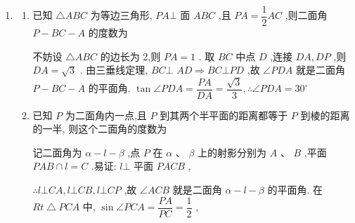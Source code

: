 \begin{enumerate}
\begin{enumerate}
\begin{jieda}
            $\angle {ACB}$ 就是二面角 $\alpha  - l - \beta$ 的平面角, $A$ 到 $\beta$ 的距离 ${AB} = {AC} \cdot  \sin \angle {ACB} = 2\sqrt{3} \cdot  \sin {60}^{ \circ  } = 3$
        \end{jieda}
        \item 两个等腰三角形 ${ABC}$ 与 ${DBC}$ 的公共底边 ${BC} = {16}{{cm}},{AB} = {17}{{cm}},{DB}\bot {DC}$ ,且二面角 $A - {BC} - D$ 成 ${60}^{ \circ  }$ ,则 $A,D$ 间的距离等于 ${{cm}}$
        \begin{jieda}
            取线段 ${BC}$ 中点为 $E$ ,连接 $\bigtriangleup  {AED}$ 三边. 由于 ${EA}$ , ${ED}$ 都与 ${BC}$ 垂直

            $\angle {AED}$ 就是二面角 $A - {BC} - D$ 的平面角, ${EA} = \sqrt{B{A}^{2} - B{E}^{2}} = {15}{{cm}},{ED} = {EB} = 8{{cm}}$ ,由余弦定理, ${AD} =$  $\sqrt{E{A}^{2} + E{D}^{2} - 2 \cdot  {EA} \cdot  {ED} \cdot  \cos \angle {AED}} = {13}{{cm}}.$
        \end{jieda}
    \end{enumerate}
    \item \begin{enumerate}
        \item 已知 $\bigtriangleup {ABC}$ 为等边三角形, ${PA} \bot$ 面 ${ABC}$ ,且 ${PA} = \dfrac{1}{2}{AC}$ ,则二面角 $P - {BC} - A$ 的度数为
        \begin{jieda}
            不妨设 $\bigtriangleup {ABC}$ 的边长为 2,则 ${PA} = 1$ . 取 ${BC}$ 中点 $D$ ,连接 ${DA},{DP}$ ,则 ${DA} = \sqrt{3}$ . 由三垂线定理, ${BC} \bot$  ${AD} \Longrightarrow  {BC} \bot  {PD}$ ,故 $\angle {PDA}$ 就是二面角 $P - {BC} - A$ 的平面角. $\tan \angle {PDA} = \dfrac{PA}{DA} = \dfrac{\sqrt{3}}{3},\therefore \angle {PDA} = {30}^{ \circ  }$
        \end{jieda}
        \item 已知 $P$ 为二面角内一点,且 $P$ 到其两个半平面的距离都等于 $P$ 到棱的距离的一半, 则这个二面角的度数为
        \begin{jieda}
            记二面角为 $\alpha  - l - \beta$ ,点 $P$ 在 $\alpha$ 、 $\beta$ 上的射影分别为 $A$ 、 $B$ ,平面 ${PAB} \cap  l = C$ .易证: $l \bot$ 平面 ${PACB}$ ,
            
            $\therefore l \bot  {CA},l \bot  {CB},l \bot  {CP}$ ,故 $\angle {ACB}$ 就是二面角 $\alpha  - l - \beta$ 的平面角. 在 ${{Rt}} \bigtriangleup  {PCA}$ 中, $\sin \angle {PCA} = \dfrac{PA}{PC} = \dfrac{1}{2}$ ,
            

\end{jieda}
\end{enumerate}
\end{enumerate}
